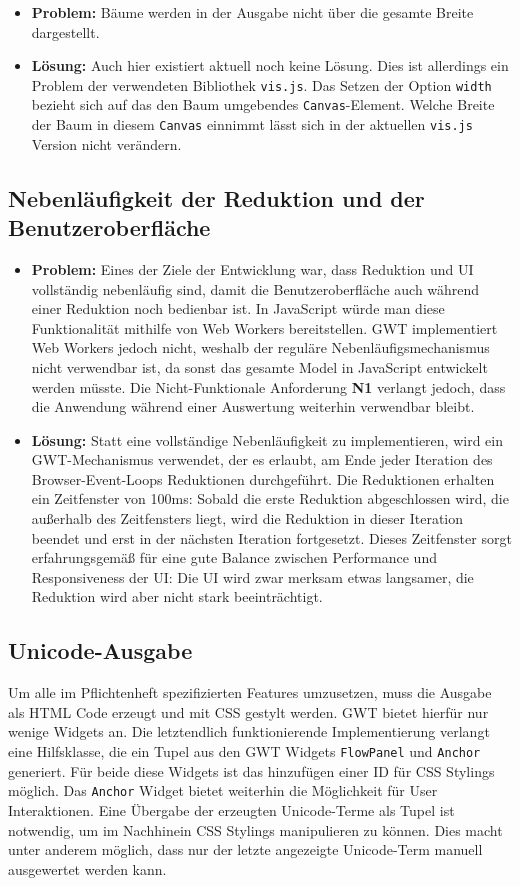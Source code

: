 \documentclass[parskip=full,11pt]{scrartcl}
\begin{document}
\begin{itemize}
\item[] \textbf{Problem:} Bäume werden in der Ausgabe nicht über die gesamte Breite dargestellt.
\item[] \textbf{Lösung:} Auch hier existiert aktuell noch keine Lösung. Dies ist allerdings ein Problem der verwendeten Bibliothek \texttt{vis.js}. Das Setzen der Option \texttt{width} bezieht sich auf das den Baum umgebendes \texttt{Canvas}-Element. Welche Breite der Baum in diesem \texttt{Canvas} einnimmt lässt sich in der aktuellen \texttt{vis.js} Version nicht verändern.
\end{itemize}

\subsection{Nebenläufigkeit der Reduktion und der Benutzeroberfläche}
\begin{itemize}
\item[] \textbf{Problem:}
Eines der Ziele der Entwicklung war, dass Reduktion und UI vollständig nebenläufig sind, damit die Benutzeroberfläche auch während einer Reduktion noch bedienbar ist.
In JavaScript würde man diese Funktionalität mithilfe von Web Workers bereitstellen.
GWT implementiert Web Workers jedoch nicht, weshalb der reguläre Nebenläufigsmechanismus nicht verwendbar ist, da sonst das gesamte Model in JavaScript entwickelt werden müsste.
Die Nicht-Funktionale Anforderung \textbf{N1} verlangt jedoch, dass die Anwendung während einer Auswertung weiterhin verwendbar bleibt.
\item[] \textbf{Lösung:}
Statt eine vollständige Nebenläufigkeit zu implementieren, wird ein GWT-Mechanismus verwendet, der es erlaubt, am Ende jeder Iteration des Browser-Event-Loops Reduktionen durchgeführt.
Die Reduktionen erhalten ein Zeitfenster von 100ms: Sobald die erste Reduktion abgeschlossen wird, die außerhalb des Zeitfensters liegt, wird die Reduktion in dieser Iteration beendet und erst in der nächsten Iteration fortgesetzt.
Dieses Zeitfenster sorgt erfahrungsgemäß für eine gute Balance zwischen Performance und Responsiveness der UI: Die UI wird zwar merksam etwas langsamer, die Reduktion wird aber nicht stark beeinträchtigt.
\end{itemize}

\subsection{Unicode-Ausgabe}
Um alle im Pflichtenheft spezifizierten Features umzusetzen, muss die Ausgabe als HTML Code erzeugt und mit CSS gestylt werden. GWT bietet hierfür nur wenige Widgets an. Die letztendlich funktionierende Implementierung verlangt eine Hilfsklasse, die ein Tupel aus den GWT Widgets \texttt{FlowPanel} und \texttt{Anchor} generiert. Für beide diese Widgets ist das hinzufügen einer ID für CSS Stylings möglich. Das \texttt{Anchor} Widget bietet weiterhin die Möglichkeit für User Interaktionen. Eine Übergabe der erzeugten Unicode-Terme als Tupel ist notwendig, um im Nachhinein CSS Stylings manipulieren zu können. Dies macht unter anderem möglich, dass nur der letzte angezeigte Unicode-Term manuell ausgewertet werden kann.
\end{document}
